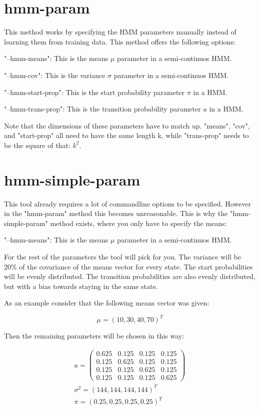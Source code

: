 \section{hmm-param}

This method works by specifying the HMM parameters manually instead of learning them from training data. This method offers the following options: 

"--hmm-means": This is the means $\mu$ parameter in a semi-continuos HMM. 

"--hmm-cov": This is the variance $\sigma$ parameter in a semi-continuos HMM. 

"--hmm-start-prop": This is the start probability parameter $\pi$ in a HMM. 

"--hmm-trans-prop": This is the transition probability parameter $a$ in a HMM. 

Note that the dimensions of these parameters have to match up. "means", "cov", and "start-prop" all need to have the same length k, while "trans-prop" needs to be the square of that: $k^2$. 

\section{hmm-simple-param}

This tool already requires a lot of commandline options to be specified. However in the "hmm-param" method this becomes unreasonable. This is why the "hmm-simple-param" method exists, where you only have to specify the means: 

"--hmm-means": This is the means $\mu$ parameter in a semi-continuos HMM. 

For the rest of the parameters the tool will pick for you. The variance will be 20\% of the covariance of the means vector for every state. The start probabilities will be evenly distributed. The transition probabilities are also evenly distributed, but with a bias towards staying in the same state. 

As an example consider that the following means vector was given: 

\begin{equation}
    \mu = (10, 30, 40, 70)^T
\end{equation}

Then the remaining parameters will be chosen in this way:

\begin{equation}
    \begin{split}
    a = 
    \begin{pmatrix}
        0.625 & 0.125 & 0.125 & 0.125 \\
        0.125 & 0.625 & 0.125 & 0.125 \\
        0.125 & 0.125 & 0.625 & 0.125 \\
        0.125 & 0.125 & 0.125 & 0.625
    \end{pmatrix} \\
    \sigma^2 = (144, 144, 144, 144)^T \\
    \pi = (0.25, 0.25, 0.25, 0.25)^T 
\end{split}
\end{equation}

